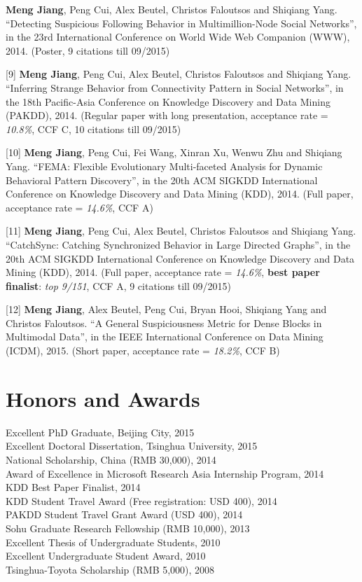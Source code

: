 \documentclass[margin, 10pt]{res} %
\begin{document}
\begin{resume}
[8] {\bf Meng Jiang}, Peng Cui, Alex Beutel, Christos Faloutsos and Shiqiang Yang. ``Detecting Suspicious Following Behavior in Multimillion-Node Social Networks'', in the 23rd International Conference on World Wide Web Companion (WWW), 2014. (Poster, 9 citations till 09/2015)

[9] {\bf Meng Jiang}, Peng Cui, Alex Beutel, Christos Faloutsos and Shiqiang Yang. ``Inferring Strange Behavior from Connectivity Pattern in Social Networks'', in the 18th Pacific-Asia Conference on Knowledge Discovery and Data Mining (PAKDD), 2014. (Regular paper with long presentation, acceptance rate = {\em 10.8\%}, CCF C, 10 citations till 09/2015)

[10] {\bf Meng Jiang}, Peng Cui, Fei Wang, Xinran Xu, Wenwu Zhu and Shiqiang Yang. ``FEMA: Flexible Evolutionary Multi-faceted Analysis for Dynamic Behavioral Pattern Discovery'', in the 20th ACM SIGKDD International Conference on Knowledge Discovery and Data Mining (KDD), 2014. (Full paper, acceptance rate = {\em 14.6\%}, CCF A)

[11] {\bf Meng Jiang}, Peng Cui, Alex Beutel, Christos Faloutsos and Shiqiang Yang. ``CatchSync: Catching Synchronized Behavior in Large Directed Graphs'', in the 20th ACM SIGKDD International Conference on Knowledge Discovery and Data Mining (KDD), 2014. (Full paper, acceptance rate = {\em 14.6\%}, {\bf best paper finalist}: {\em top 9/151}, CCF A, 9 citations till 09/2015)

[12] {\bf Meng Jiang}, Alex Beutel, Peng Cui, Bryan Hooi, Shiqiang Yang and Christos Faloutsos. ``A General Suspiciousness Metric for Dense Blocks in Multimodal Data'', in the IEEE International Conference on Data Mining (ICDM), 2015. (Short paper, acceptance rate = {\em 18.2\%}, CCF B)


\section{Honors and Awards}

{Excellent PhD Graduate, Beijing City}, 2015 \\
{Excellent Doctoral Dissertation, Tsinghua University}, 2015 \\
{National Scholarship, China} (RMB 30,000), 2014 \\
{Award of Excellence in Microsoft Research Asia Internship Program}, 2014 \\
{KDD Best Paper Finalist}, 2014 \\
{KDD Student Travel Award} (Free registration: USD 400), 2014 \\
{PAKDD Student Travel Grant Award} (USD 400), 2014 \\
{Sohu Graduate Research Fellowship} (RMB 10,000), 2013 \\
{Excellent Thesis of Undergraduate Students}, 2010 \\
{Excellent Undergraduate Student Award}, 2010 \\
{Tsinghua-Toyota Scholarship} (RMB 5,000), 2008


\end{resume}
\end{document}
